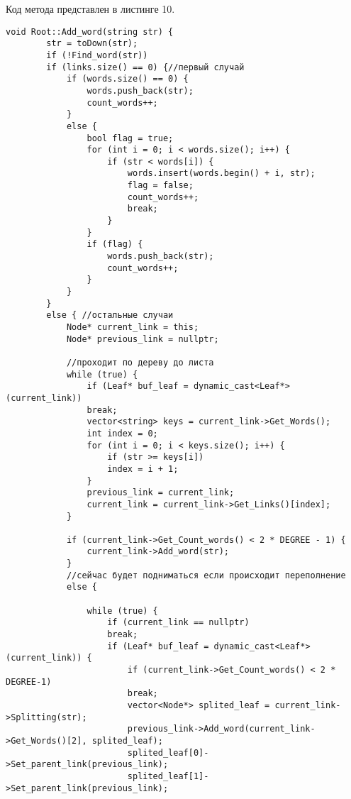 \documentclass[10pt,a4paper,final]{article} %
\begin{document}
Код метода представлен в листинге 10. \begin{lstlisting}[label=addWordMethod, caption = Метод Add\_word]
	void Root::Add_word(string str) {
		str = toDown(str);
		if (!Find_word(str))
		if (links.size() == 0) {//первый случай
			if (words.size() == 0) {
				words.push_back(str);
				count_words++;
			}
			else {
				bool flag = true;
				for (int i = 0; i < words.size(); i++) {
					if (str < words[i]) {
						words.insert(words.begin() + i, str);
						flag = false;
						count_words++;
						break;
					}
				}
				if (flag) {
					words.push_back(str);
					count_words++;
				}
			}
		}
		else { //остальные случаи
			Node* current_link = this;
			Node* previous_link = nullptr;
			
			//проходит по дереву до листа
			while (true) {
				if (Leaf* buf_leaf = dynamic_cast<Leaf*>(current_link)) 
				break;
				vector<string> keys = current_link->Get_Words();
				int index = 0;
				for (int i = 0; i < keys.size(); i++) {
					if (str >= keys[i])
					index = i + 1;
				}
				previous_link = current_link;
				current_link = current_link->Get_Links()[index];
			}
			
			if (current_link->Get_Count_words() < 2 * DEGREE - 1) {
				current_link->Add_word(str);
			}
			//сейчас будет подниматься если происходит переполнение
			else {
				
				while (true) {
					if (current_link == nullptr)
					break;
					if (Leaf* buf_leaf = dynamic_cast<Leaf*>(current_link)) {
						if (current_link->Get_Count_words() < 2 * DEGREE-1)
						break;
						vector<Node*> splited_leaf = current_link->Splitting(str);
						previous_link->Add_word(current_link->Get_Words()[2], splited_leaf);
						splited_leaf[0]->Set_parent_link(previous_link);
						splited_leaf[1]->Set_parent_link(previous_link);
						

\end{lstlisting}
\end{document}
